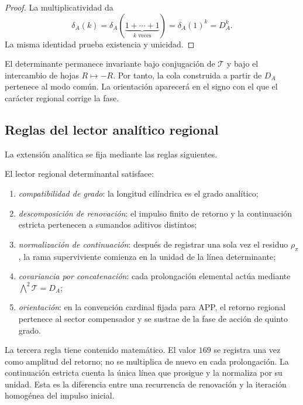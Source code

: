 \begin{proof}
La multiplicatividad da
\[
\delta_A(k)
=\delta_A(\underbrace{1+\cdots+1}_{k\text{ veces}})
=\delta_A(1)^k=D_A^k.
\]
La misma identidad prueba existencia y unicidad.
\end{proof}

El determinante permanece invariante bajo conjugación de
\(\mathcal T\) y bajo el intercambio de hojas \(R\mapsto-R\). Por tanto, la
cola construida a partir de \(D_A\) pertenece al modo común. La orientación
aparecerá en el signo con el que el carácter regional corrige la fase.

\subsection{Reglas del lector analítico regional}

La extensión analítica se fija mediante las reglas siguientes.

\begin{definition}
\label{p12-83-c13-s3:def:lector-regional-determinantal}
El lector regional determinantal satisface:
\begin{enumerate}
  \item \emph{compatibilidad de grado}: la longitud cilíndrica es el grado
  analítico;
  \item \emph{descomposición de renovación}: el impulso finito de retorno y
  la continuación estricta pertenecen a sumandos aditivos distintos;
  \item \emph{normalización de continuación}: después de registrar una sola
  vez el residuo \(\rho_\pi\), la rama superviviente comienza en la unidad de
  la línea determinante;
  \item \emph{covariancia por concatenación}: cada prolongación elemental
  actúa mediante \(\bigwedge^2\mathcal T=D_A\);
  \item \emph{orientación}: en la convención cardinal fijada para APP, el
  retorno regional pertenece al sector compensador y se sustrae de la fase
  de acción de quinto grado.
\end{enumerate}
\end{definition}

La tercera regla tiene contenido matemático. El valor \(169\) se registra
una vez como amplitud del retorno; no se multiplica de nuevo en cada
prolongación. La continuación estricta cuenta la única línea que prosigue y
la normaliza por su unidad. Esta es la diferencia entre una recurrencia de
renovación y la iteración homogénea del impulso inicial.

